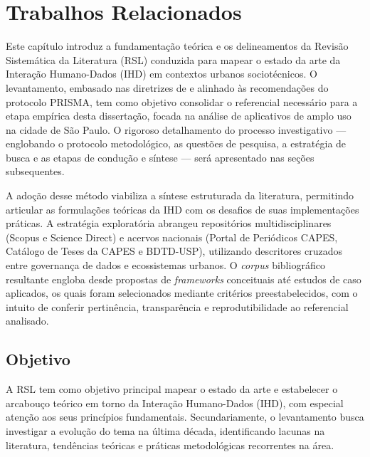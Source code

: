 \documentclass[
	12pt,				%
	oneside,			%
	a4paper,			%
	english,			%
	brazil				%
	]{abntex2ppgsi}
\begin{document}

\chapter{Trabalhos Relacionados}

    Este capítulo introduz a fundamentação teórica e os delineamentos da Revisão Sistemática da Literatura (RSL) conduzida para mapear o estado da arte da Interação Humano-Dados (IHD) em contextos urbanos sociotécnicos. O levantamento, embasado nas diretrizes de  e alinhado às recomendações do protocolo PRISMA, tem como objetivo consolidar o referencial necessário para a etapa empírica desta dissertação, focada na análise de aplicativos de amplo uso na cidade de São Paulo. O rigoroso detalhamento do processo investigativo — englobando o protocolo metodológico, as questões de pesquisa, a estratégia de busca e as etapas de condução e síntese — será apresentado nas seções subsequentes.

    A adoção desse método viabiliza a síntese estruturada da literatura, permitindo articular as formulações teóricas da IHD com os desafios de suas implementações práticas. A estratégia exploratória abrangeu repositórios multidisciplinares (Scopus e Science Direct) e acervos nacionais (Portal de Periódicos CAPES, Catálogo de Teses da CAPES e BDTD-USP), utilizando descritores cruzados entre governança de dados e ecossistemas urbanos. O \textit{corpus} bibliográfico resultante engloba desde propostas de \textit{frameworks} conceituais até estudos de caso aplicados, os quais foram selecionados mediante critérios preestabelecidos, com o intuito de conferir pertinência, transparência e reprodutibilidade ao referencial analisado.
    
  

\section{Objetivo}

    A RSL tem como objetivo principal mapear o estado da arte e estabelecer o arcabouço teórico em torno da Interação Humano-Dados (IHD), com especial atenção aos seus princípios fundamentais. Secundariamente, o levantamento busca investigar a evolução do tema na última década, identificando lacunas na literatura, tendências teóricas e práticas metodológicas recorrentes na área.
\end{document}
